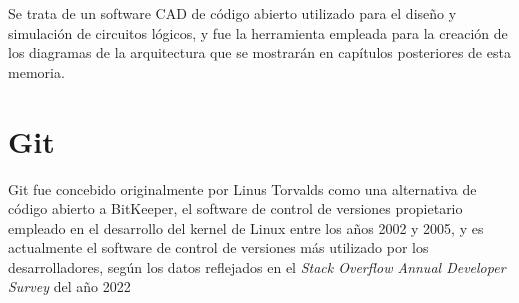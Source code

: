 Se trata de un software CAD de código abierto utilizado para el diseño y simulación de circuitos lógicos, y fue la herramienta empleada para la creación de los diagramas de la arquitectura que se mostrarán en capítulos posteriores de esta memoria.

\section{Git}

Git fue concebido originalmente por Linus Torvalds como una alternativa de código abierto a BitKeeper, el software de control de versiones propietario empleado en el desarrollo del kernel de Linux entre los años 2002 y 2005\cite{githistory}, y es actualmente el software de control de versiones más utilizado por los desarrolladores, según los datos reflejados en el \textit{Stack Overflow Annual Developer Survey} del año 2022\cite{stackoverflow}